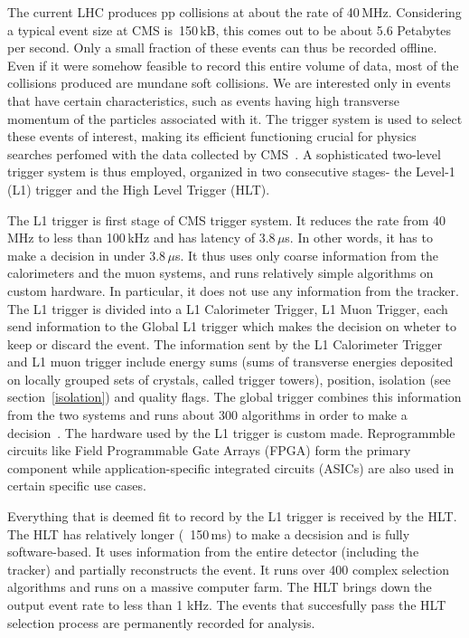 The current LHC produces pp collisions at about the rate of 40\,MHz. Considering a typical event size at CMS is~150\,kB, this comes out to be about 5.6 Petabytes per second. Only a small fraction of these events can thus be recorded offline. Even if it were somehow feasible to record this entire volume of data,  most of the collisions produced are mundane soft collisions. We are interested only in events that have certain characteristics, such as events having high transverse momentum of the particles associated with it. The trigger system is used to select these events of interest, making its efficient functioning crucial for physics searches perfomed with the data collected by CMS~\cite{trigger1}. A sophisticated two-level trigger system is thus employed, organized in two consecutive stages- the Level-1 (L1) trigger and the High Level Trigger (HLT).


The L1 trigger is first stage of CMS trigger system. It reduces the rate from 40\,MHz to less than 100\,kHz and has latency of 3.8\,$\mu$s. In other words, it has to make a decision in under 3.8\,$\mu$s. It thus uses only coarse information from the calorimeters and the muon systems, and runs relatively simple algorithms on custom hardware. In particular, it does not use any information from the tracker. The L1 trigger is divided into a L1 Calorimeter Trigger, L1 Muon Trigger, each send information to the Global L1 trigger which makes the decision on wheter to keep or discard the event. The information sent by the L1 Calorimeter Trigger and L1 muon trigger include energy sums (sums of transverse energies deposited on locally grouped sets of crystals, called trigger towers), position, isolation (see section~\ref{isolation}) and quality flags. The global trigger combines this information from the two systems and runs about 300 algorithms in order to make a decision~\cite{trigger2}. The hardware used by the L1 trigger is custom made. Reprogrammble circuits like Field Programmable Gate Arrays (FPGA) form the primary component while application-specific integrated circuits (ASICs) are also used in certain specific use cases.  

Everything that is deemed fit to record by the L1 trigger is received by the HLT. The HLT has relatively longer (~150\,ms) to make a decsision and is fully software-based. It uses information from the entire detector (including the tracker) and partially reconstructs the event. It runs over 400 complex selection algorithms and runs on a massive computer farm. The HLT brings down the output event rate to less than 1 kHz. The events that succesfully pass the HLT selection process are permanently recorded for analysis. 

